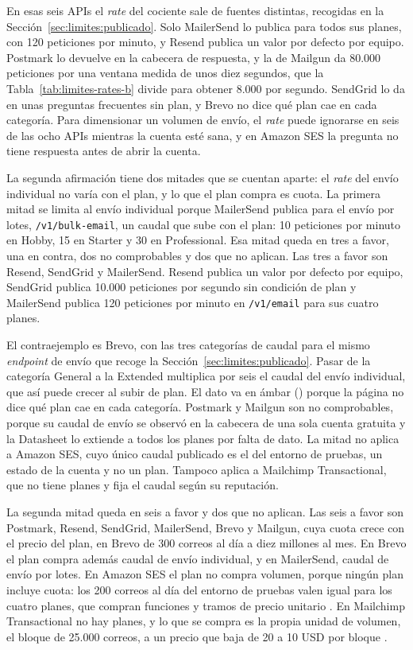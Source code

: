 En esas seis APIs el \textit{rate} del cociente sale de fuentes distintas, recogidas en la Sección~\ref{sec:limites:publicado}.
Solo MailerSend lo publica para todos sus planes, con 120 peticiones por minuto, y Resend publica un valor por defecto por equipo.
Postmark lo devuelve en la cabecera de respuesta, y la de Mailgun da 80.000 peticiones por una ventana medida de unos diez segundos, que la Tabla~\ref{tab:limites-rates-b} divide para obtener 8.000 por segundo.
SendGrid lo da en unas preguntas frecuentes sin plan, y Brevo no dice qué plan cae en cada categoría.
Para dimensionar un volumen de envío, el \textit{rate} puede ignorarse en seis de las ocho APIs mientras la cuenta esté sana, y en Amazon SES la pregunta no tiene respuesta antes de abrir la cuenta.

La segunda afirmación tiene dos mitades que se cuentan aparte: el \textit{rate} del envío individual no varía con el plan, y lo que el plan compra es cuota.
La primera mitad se limita al envío individual porque MailerSend publica para el envío por lotes, \texttt{/v1/bulk-email}, un caudal que sube con el plan: 10 peticiones por minuto en Hobby, 15 en Starter y 30 en Professional.
Esa mitad queda en tres a favor, una en contra, dos no comprobables y dos que no aplican.
Las tres a favor son Resend, SendGrid y MailerSend.
Resend publica un valor por defecto por equipo, SendGrid publica 10.000 peticiones por segundo sin condición de plan y MailerSend publica 120 peticiones por minuto en \texttt{/v1/email} para sus cuatro planes.

El contraejemplo es Brevo, con las tres categorías de caudal para el mismo \textit{endpoint} de envío que recoge la Sección~\ref{sec:limites:publicado}.
Pasar de la categoría General a la Extended multiplica por seis el caudal del envío individual, que así puede crecer al subir de plan.
El dato va en ámbar (\semambar{}) porque la página no dice qué plan cae en cada categoría.
Postmark y Mailgun son no comprobables, porque su caudal de envío se observó en la cabecera de una sola cuenta gratuita y la Datasheet lo extiende a todos los planes por falta de dato.
La mitad no aplica a Amazon SES, cuyo único caudal publicado es el del entorno de pruebas, un estado de la cuenta y no un plan.
Tampoco aplica a Mailchimp Transactional, que no tiene planes y fija el caudal según su reputación.

La segunda mitad queda en seis a favor y dos que no aplican.
Las seis a favor son Postmark, Resend, SendGrid, MailerSend, Brevo y Mailgun, cuya cuota crece con el precio del plan, en Brevo de 300 correos al día a diez millones al mes.
En Brevo el plan compra además caudal de envío individual, y en MailerSend, caudal de envío por lotes.
En Amazon SES el plan no compra volumen, porque ningún plan incluye cuota: los 200 correos al día del entorno de pruebas valen igual para los cuatro planes, que compran funciones y tramos de precio unitario \citep{sespricing}.
En Mailchimp Transactional no hay planes, y lo que se compra es la propia unidad de volumen, el bloque de 25.000 correos, a un precio que baja de 20 a 10 USD por bloque \citep{mailchimppricing}.

